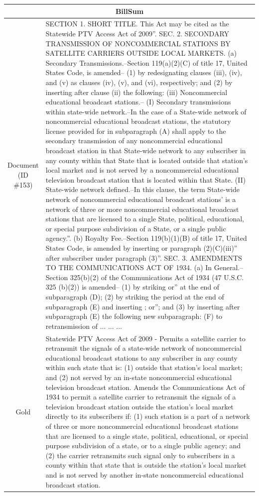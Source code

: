 \begin{table}[bth!]
\scriptsize
\centering
\renewcommand{\arraystretch}{1.3}
\begin{tabular}{c|p{}}
\hline
\multicolumn{2}{c}{BillSum} \\ \hline
\makecell{Document\\(ID \#153)} & 
SECTION 1. SHORT TITLE. This Act may be cited as the   Statewide PTV Access Act of 2009''. SEC. 2. SECONDARY TRANSMISSION OF NONCOMMERCIAL STATIONS BY SATELLITE CARRIERS OUTSIDE LOCAL MARKETS. (a) Secondary Transmissions.--Section 119(a)(2)(C) of title 17, United States Code, is amended-- (1) by redesignating clauses (iii), (iv), and (v) as clauses (iv), (v), and (vi), respectively; and (2) by inserting after clause (ii) the following:   (iii) Noncommercial educational broadcast stations.--   (I) Secondary transmissions within state-wide network.--In the case of a State-wide network of noncommercial educational broadcast stations, the statutory license provided for in subparagraph (A) shall apply to the secondary transmission of any noncommercial educational broadcast station in that State-wide network to any subscriber in any county within that State that is located outside that station's local market and is not served by a noncommercial educational television broadcast station that is located within that State.   (II) State-wide network defined.--In this clause, the term   State-wide network of noncommercial educational broadcast stations' is a network of three or more noncommercial educational broadcast stations that are licensed to a single State, political, educational, or special purpose subdivision of a State, or a single public agency.''. (b) Royalty Fee.--Section 119(b)(1)(B) of title 17, United States Code, is amended by inserting   or paragraph (2)(C)(iii)'' after   subscriber under paragraph (3)''. SEC. 3. AMENDMENTS TO THE COMMUNICATIONS ACT OF 1934. (a) In General.--Section 325(b)(2) of the Communications Act of 1934 (47 U.S.C. 325 (b)(2)) is amended-- (1) by striking   or'' at the end of subparagraph (D); (2) by striking the period at the end of subparagraph (E) and inserting   ; or''; and (3) by inserting after subparagraph (E) the following new subparagraph:   (F) to retransmission of ... ... ... 
\\ \hline
Gold & 
Statewide PTV Access Act of 2009 - Permits a satellite carrier to retransmit the signals of a state-wide network of noncommercial educational broadcast stations to any subscriber in any county within such state that is: (1) outside that station's local market; and (2) not served by an in-state noncommercial educational television broadcast station. Amends the Communications Act of 1934 to permit a satellite carrier to retransmit the signals of a television broadcast station outside the station's local market directly to its subscribers if: (1) such station is a part of a network of three or more noncommercial educational broadcast stations that are licensed to a single state, political, educational, or special purpose subdivision of a state, or to a single public agency; and (2) the carrier retransmits such signal only to subscribers in a county within that state that is outside the station's local market and is not served by another in-state noncommercial educational broadcast station.

\end{tabular}
\end{table}
